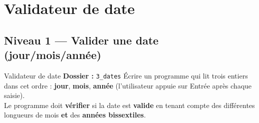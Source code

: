 
\section{Validateur de date}

\subsection{Niveau 1 — Valider une date (jour/mois/année)}

\begin{UPSTIManipulation}{Validateur de date}
	\textbf{Dossier :} \texttt{3\_dates}
	Écrire un programme qui lit trois entiers dans cet ordre : \textbf{jour}, \textbf{mois}, \textbf{année} (l’utilisateur appuie sur Entrée après chaque saisie).\\
	Le programme doit \textbf{vérifier} si la date est \textbf{valide} en tenant compte des différentes longueurs de mois \textbf{et} des \textbf{années bissextiles}.


\end{UPSTIManipulation}
